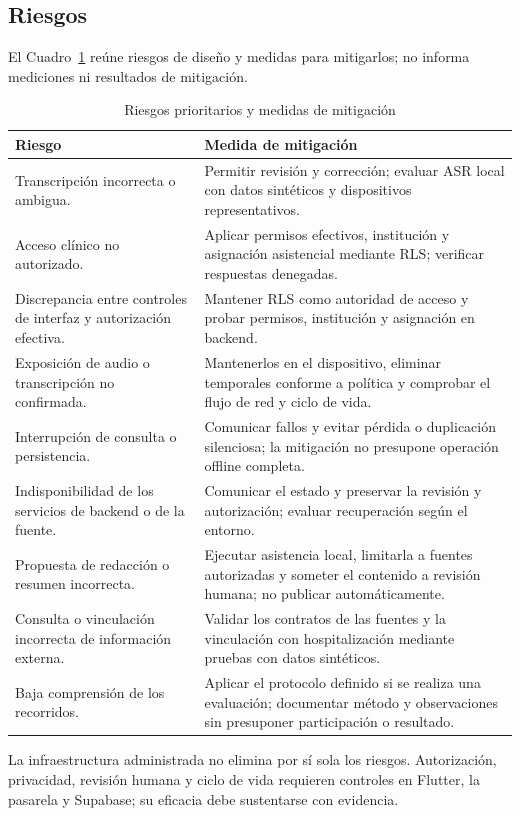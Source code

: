 \subsection{Riesgos}

El Cuadro~\ref{tab:gestion_riesgos} reúne riesgos de diseño y medidas para mitigarlos; no informa mediciones ni resultados de mitigación.

\begin{table}[H]
\caption{Riesgos prioritarios y medidas de mitigación}
\label{tab:gestion_riesgos}
\begin{tabularx}{\textwidth}{|X|X|}
\hline
\textbf{Riesgo} & \textbf{Medida de mitigación} \\
\hline
Transcripción incorrecta o ambigua. & Permitir revisión y corrección; evaluar ASR local con datos sintéticos y dispositivos representativos. \\
\hline
Acceso clínico no autorizado. & Aplicar permisos efectivos, institución y asignación asistencial mediante RLS; verificar respuestas denegadas. \\
\hline
Discrepancia entre controles de interfaz y autorización efectiva. & Mantener RLS como autoridad de acceso y probar permisos, institución y asignación en backend. \\
\hline
Exposición de audio o transcripción no confirmada. & Mantenerlos en el dispositivo, eliminar temporales conforme a política y comprobar el flujo de red y ciclo de vida. \\
\hline
Interrupción de consulta o persistencia. & Comunicar fallos y evitar pérdida o duplicación silenciosa; la mitigación no presupone operación offline completa. \\
\hline
Indisponibilidad de los servicios de backend o de la fuente. & Comunicar el estado y preservar la revisión y autorización; evaluar recuperación según el entorno. \\
\hline
Propuesta de redacción o resumen incorrecta. & Ejecutar asistencia local, limitarla a fuentes autorizadas y someter el contenido a revisión humana; no publicar automáticamente. \\
\hline
Consulta o vinculación incorrecta de información externa. & Validar los contratos de las fuentes y la vinculación con hospitalización mediante pruebas con datos sintéticos. \\
\hline
Baja comprensión de los recorridos. & Aplicar el protocolo definido si se realiza una evaluación; documentar método y observaciones sin presuponer participación o resultado. \\
\hline
\end{tabularx}
\end{table}

La infraestructura administrada no elimina por sí sola los riesgos. Autorización, privacidad, revisión humana y ciclo de vida requieren controles en Flutter, la pasarela y Supabase; su eficacia debe sustentarse con evidencia.
